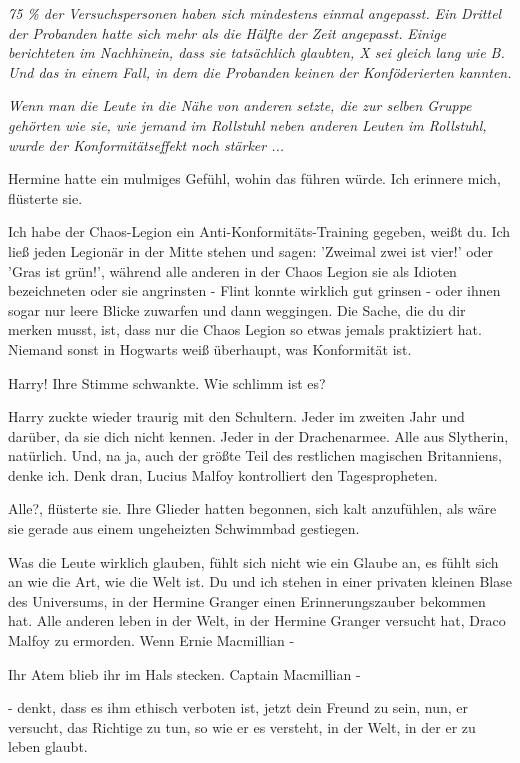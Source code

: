 \emph{75 \% der Versuchspersonen haben sich mindestens einmal \glqq{}
angepasst\grqq{}.} \emph{Ein Drittel der Probanden hatte sich mehr als die
Hälfte der Zeit angepasst.} \emph{Einige berichteten im Nachhinein, dass sie
tatsächlich glaubten, X sei gleich lang wie B. Und das in einem Fall, in dem die
Probanden keinen der Konföderierten kannten.}

\emph{Wenn man die Leute in die Nähe von anderen setzte, die zur selben Gruppe
gehörten wie sie, wie jemand im Rollstuhl neben anderen Leuten im Rollstuhl,
wurde der Konformitätseffekt noch stärker ...}

Hermine hatte ein mulmiges Gefühl, wohin das führen würde. \glqq{}Ich erinnere
mich\grqq{}, flüsterte sie.

\glqq{}Ich habe der Chaos-Legion ein Anti-Konformitäts-Training gegeben, weißt
du. Ich ließ jeden Legionär in der Mitte stehen und sagen: 'Zweimal zwei ist
vier!' oder 'Gras ist grün!', während alle anderen in der Chaos Legion sie als
Idioten bezeichneten oder sie angrinsten - Flint konnte wirklich gut grinsen -
oder ihnen sogar nur leere Blicke zuwarfen und dann weggingen. Die Sache, die du
dir merken musst, ist, dass nur die Chaos Legion so etwas jemals praktiziert
hat. Niemand sonst in Hogwarts weiß überhaupt, was Konformität ist.\grqq{}

\glqq{}Harry!\grqq{} Ihre Stimme schwankte. \glqq{}Wie schlimm ist es?\grqq{}

Harry zuckte wieder traurig mit den Schultern. \glqq{}Jeder im zweiten Jahr und
darüber, da sie dich nicht kennen. Jeder in der Drachenarmee. Alle aus
Slytherin, natürlich. Und, na ja, auch der größte Teil des restlichen magischen
Britanniens, denke ich. Denk dran, Lucius Malfoy kontrolliert den
Tagespropheten.\grqq{}

\glqq{}Alle?\grqq{}, flüsterte sie. Ihre Glieder hatten begonnen, sich kalt
anzufühlen, als wäre sie gerade aus einem ungeheizten Schwimmbad gestiegen.

\glqq{}Was die Leute wirklich glauben, fühlt sich nicht wie ein Glaube an, es
fühlt sich an wie die Art, wie die Welt ist. Du und ich stehen in einer privaten
kleinen Blase des Universums, in der Hermine Granger einen Erinnerungszauber
bekommen hat. Alle anderen leben in der Welt, in der Hermine Granger versucht
hat, Draco Malfoy zu ermorden. Wenn Ernie Macmillian -\grqq{}

Ihr Atem blieb ihr im Hals stecken. Captain Macmillian -

\glqq{}- denkt, dass es ihm ethisch verboten ist, jetzt dein Freund zu sein, nun,
er versucht, das Richtige zu tun, so wie er es versteht, in der Welt, in der er
zu leben glaubt.\grqq{}

